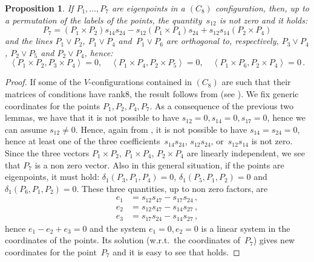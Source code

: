 \documentclass[a4paper, 11pt, reqno]{amsart}
\theoremstyle{plain}
\newtheorem{prop}[lemma]{Proposition}
\theoremstyle{definition}
\newcommand{\scl}[2]{\left\langle {#1}, {#2} \right\rangle}
\begin{document}
\begin{prop}
\label{prop:conf8_partA}
If $P_1, \dotsc, P_7$ are eigenpoints in a $(C_8)$ configuration, then, up to a permutation of 
the labels of the points, the quantity~$s_{12}$ is not zero and it holds:
\begin{equation}
\label{formula:ortocentro}
P_7 = (P_1 \times P_2)s_{14}s_{24} -
  s_{12}(P_1 \times P_4)s_{24} + s_{12}s_{14}(P_2 \times P_4)
\end{equation}
and the lines $P_1 \vee P_2$, $P_1 \vee P_4$ and~$P_1 \vee P_6$
are orthogonal to, respectively, $P_3 \vee P_4$, $P_2 \vee P_5$ and 
$P_2 \vee P_4$, hence:
%
\[
  \scl{P_1 \times P_2}{P_3 \times P_4} = 0, \quad 
  \scl{P_1 \times P_4}{P_2 \times P_5} = 0, \quad 
  \scl{P_1 \times P_6}{P_2 \times P_4} = 0 \,.
\]
%
\end{prop}
\begin{proof}
If some of the $V$-configurations contained in $(C_8)$ are such that their matrices of conditions have rank$8$, 
the result follows from  (see ).
We fix generic coordinates for the points $P_1, P_2, P_4, P_7$.
As a consequence of the previous two lemmas, we have that it is not possible
to have $s_{12}=0, s_{14}=0, s_{17}=0$, hence we can assume $s_{12} \not=0$.
Hence, again from , it is not possible to 
have $s_{14}=s_{24}=0$, hence at least one of the three coefficients~$s_{14}s_{24}$, $s_{12}s_{24}$, or~$s_{12}s_{14}$ is not zero. Since the 
three vectors $P_1\times P_2$, $P_1\times P_4$, $P_2\times P_4$ are linearly independent, we see that $P_7$ is a non zero vector. Also in this general situation, if the points are eigenpoints, it must hold: 
$\delta_1(P_3, P_1, P_4) = 0$, $\delta_1(P_5, P_1, P_2) = 0$ and 
$\delta_1(P_6, P_1, P_2)=0$. These three quantities, up to non zero factors, are 
%
\begin{align*}
 e_1 &= s_{12}s_{47}-s_{17}s_{24} \,,\\
 e_2 &= s_{12}s_{47}-s_{14}s_{27} \,,\\ 
 e_3 &= s_{17}s_{24}-s_{14}s_{27} \,,
\end{align*}
%
hence $e_1-e_2+e_3 = 0$ and the system
$e_1=0, e_2 = 0$ is a linear system in the coordinates of the points. 
Its solution (w.r.t.\ the coordinates of~$P_7$) gives new coordinates for the point~$P_7$ and it is easy to see that  holds.
\end{proof}
\end{document}
